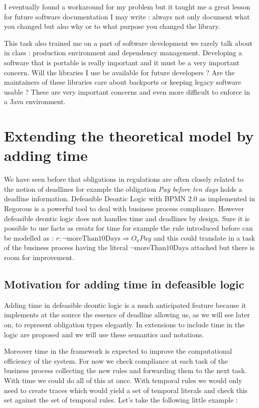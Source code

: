 \documentclass[10pt]{report}
\begin{document}
I eventually found a workaround for my problem but it taught me a great lesson for future software documentation I may write : always not only document what you changed but also why or to what purpose you changed the library.

This task also trained me on a part of software development we rarely talk about in class : production environment and dependency management. Developing a software that is portable is really important and it must be a very important concern. Will the libraries I use be available for future developers ? Are the maintainers of these libraries care about backports or keeping legacy software usable ?
These are very important concerns and even more difficult to enforce in a Java environment. %


\section{Extending the theoretical model by adding time}

We have seen before that obligations in regulations are often closely related to the notion of deadlines for example the obligation \textit{Pay before ten days} holds a deadline information. Defeasible Deontic Logic with BPMN 2.0 as implemented in Regorous is a powerful tool to deal with business process compliance. However defeasible deontic logic does not handles time and deadlines by design. Sure it is possible to use facts as ersatz for time for example the rule introduced before can be modelled as : $r: \neg \text{moreThan10Days} \Rightarrow O_{a}Pay$ and this could translate in a task of the business process having the literal $ \neg \text{moreThan10Days}$ attached but there is room for improvement.

\subsection{Motivation for adding time in defeasible logic}

Adding time in defeasible deontic logic is a much anticipated feature because it implements at the source the essence of deadline allowing us, as we will see later on, to represent obligation types elegantly. In \autocite{TemporalExtension2007} extensions to include time in the logic are proposed and we will use these semantics and notations.

Moreover time in the framework is expected to improve the computational efficiency of the system. For now we check compliance at each task of the business process collecting the new rules and forwarding them to the next task. With time we could do all of this at once. With temporal rules we would only need to create traces which would yield a set of temporal literals and check this set against the set of temporal rules. Let's take the following little example : 
\end{document}
